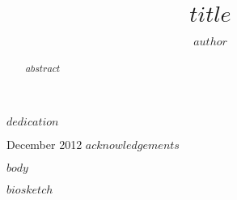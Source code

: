 \documentclass[doublespacing]{utdthesis}
\author{$author$}
\title{$title$}
\begin{document}
\frontmatter

\signaturepage


\begin{dedication} %
  $dedication$
\end{dedication}

\maketitle

\begin{acks}{December 2012} %
  $acknowledgements$
\end{acks}

\begin{abstract}
  $abstract$
\end{abstract}

\tableofcontents
\listoffigures %
\listoftables %

\mainmatter


$body$






\begin{thesisbib}  %
  
\end{thesisbib}  %


\begin{biosketch}
  $biosketch$
\end{biosketch}
\end{document}
